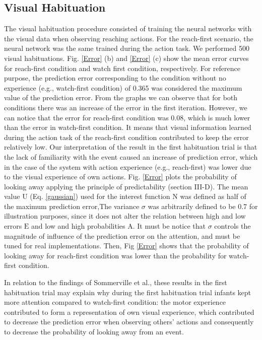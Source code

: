 \documentclass[conference]{IEEEtran}
\begin{document}
\subsection{Visual Habituation}
The visual habituation procedure consisted of training the neural networks with the visual data when observing reaching actions. For the reach-first scenario, the neural network was the same trained during the action task. We performed 500 visual habituations. Fig. \ref{Error} (b) and \ref{Error} (c) show the mean error curves for reach-first condition and watch first condition, respectively. For reference purpose, the prediction error corresponding to the condition without no experience (e.g., watch-first condition) of 0.365 was considered the maximum value of the prediction error. From the graphs we can observe that for both conditions there was an increase of the error in the first iteration. However, we can notice that the error for reach-first condition was 0.08, which is much lower than the error in watch-first condition. It means that visual information learned during the action task of the reach-first condition contributed to keep the error relatively low. Our interpretation of the result in the first habituation trial is that the lack of familiarity with the event caused an increase of prediction error, which in the case of the system with action experience (e.g., reach-first) was lower due to the visual experience of own actions. Fig. \ref{Error} plots the probability of looking away applying the principle of predictability (section III-D). The mean value \(\text{U}\) (Eq. \ref{gaussian}) used for the interest function \(\text{N}\) was defined as half of the maximum prediction error,The variance \(\sigma\) was arbitrarily defined to be 0.7 for illustration purposes, since it does not alter the relation between high and low errors \(\text{E}\)  and low and high probabilities \(\text{A}\). It must be notice that \(\sigma\) controls the magnitude of influence of the prediction error on the attention, and must be tuned for real implementations. Then, Fig \ref{Error} shows that the probability of looking away for reach-first condition was lower than the probability for watch-first condition.

In relation to the findings of Sommerville et al.\cite{sommerville2005action}, these results in the first habituation trial may explain why during the first habituation trial infants kept more attention compared to watch-first condition: the motor experience contributed to form a representation of own visual experience, which contributed to decrease the prediction error when observing others' actions and consequently to decrease the probability of looking away from an event.
\end{document}
